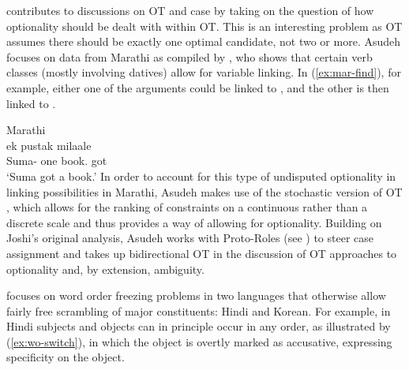 \documentclass[output=paper,hidelinks]{langscibook}
\begin{document}


\citet{Asudeh01} contributes to discussions on OT and case by taking on the
question of how optionality should be dealt with within OT.  This is an
interesting problem as OT assumes there should be exactly one optimal
candidate, not two or more. Asudeh focuses on data from Marathi as compiled by
\citet{Joshi93}, who shows that certain verb classes (mostly involving datives)
allow for variable linking.  In (\ref{ex:mar-find}), for example, either one of
the arguments could be linked to \SUBJ, and the other is then linked to
\OBJ.

\ea \label{ex:mar-find}
Marathi\\
 {ek} {pustak} {milaale} \\
{Suma-\DAT} {one} {book.\NOM} {got} \\
\glt `Suma got a book.'
\z
In order to account for this type of undisputed optionality in linking
possibilities in Marathi, Asudeh makes use of the stochastic version of OT
\citep{Boersma2000}, which allows for the ranking of constraints on a
continuous rather than a discrete scale and thus provides a way of allowing for
optionality. Building on Joshi's original analysis, Asudeh  works with
Proto-Roles (see ) to steer case assignment and takes up bidirectional OT in the discussion of OT approaches
to optionality and, by extension, ambiguity.

\citet{Lee-CSLI,lee01-diss} focuses on word order freezing problems in two languages
that otherwise allow  fairly free scrambling of major constituents: Hindi and
Korean.  For example, in Hindi subjects and objects can in principle occur in
any order, as illustrated by (\ref{ex:wo-switch}), in which the object is overtly marked
as accusative, expressing specificity on the object.  
\end{document}
